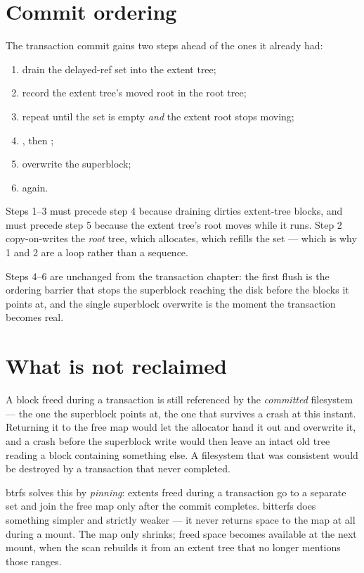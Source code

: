 \section{Commit ordering}

The transaction commit gains two steps ahead of the ones it already had:

\begin{enumerate}
  \item drain the delayed-ref set into the extent tree;
  \item record the extent tree's moved root in the root tree;
  \item repeat until the set is empty \emph{and} the extent root stops moving;
  \item {}, then ;
  \item overwrite the superblock;
  \item {} again.
\end{enumerate}

Steps 1--3 must precede step 4 because draining dirties extent-tree blocks, and
must precede step 5 because the extent tree's root moves while it runs. Step 2
copy-on-writes the \emph{root} tree, which allocates, which refills the set ---
which is why 1 and 2 are a loop rather than a sequence.

Steps 4--6 are unchanged from the transaction chapter: the first flush is the
ordering barrier that stops the superblock reaching the disk before the blocks
it points at, and the single superblock overwrite is the moment the transaction
becomes real.


\section{What is not reclaimed}

A block freed during a transaction is still referenced by the \emph{committed}
filesystem --- the one the superblock points at, the one that survives a crash
at this instant. Returning it to the free map would let the allocator hand it
out and overwrite it, and a crash before the superblock write would then leave
an intact old tree reading a block containing something else. A filesystem that
was consistent would be destroyed by a transaction that never completed.

btrfs solves this by \emph{pinning}: extents freed during a transaction go to a
separate set and join the free map only after the commit completes. bitterfs
does something simpler and strictly weaker --- it never returns space to the
map at all during a mount. The map only shrinks; freed space becomes available
at the next mount, when the scan rebuilds it from an extent tree that no longer
mentions those ranges.

